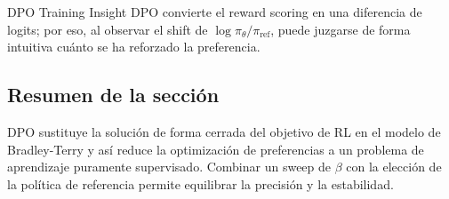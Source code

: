 \begin{knowledgebox}{DPO Training Insight}
DPO convierte el reward scoring en una diferencia de logits; por eso, al observar el shift de $\log \pi_\theta / \pi_{\mathrm{ref}}$, puede juzgarse de forma intuitiva cuánto se ha reforzado la preferencia.
\end{knowledgebox}

\subsection{Resumen de la sección}

DPO sustituye la solución de forma cerrada del objetivo de RL en el modelo de Bradley-Terry y así reduce la optimización de preferencias a un problema de aprendizaje puramente supervisado. Combinar un sweep de $\beta$ con la elección de la política de referencia permite equilibrar la precisión y la estabilidad.
